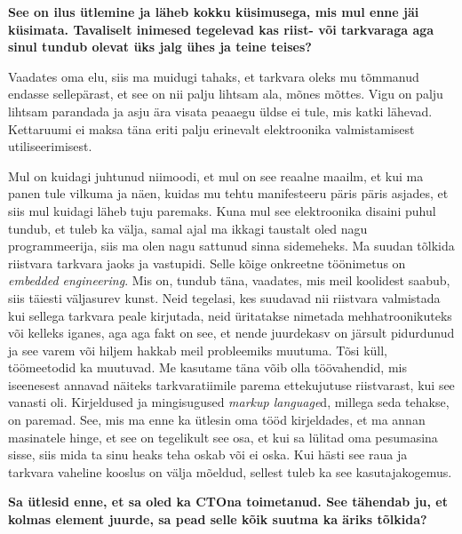 \textbf{See on ilus ütlemine ja läheb kokku küsimusega, mis mul enne jäi küsimata. Tavaliselt inimesed tegelevad kas riist- või tarkvaraga aga sinul tundub olevat üks jalg ühes ja teine teises?}

Vaadates oma elu, siis ma muidugi tahaks, et tarkvara oleks mu tõmmanud endasse sellepärast, et see on nii palju  lihtsam ala, mõnes mõttes. Vigu on palju lihtsam parandada ja asju ära visata peaaegu üldse ei tule, mis katki lähevad. Kettaruumi ei maksa täna eriti palju erinevalt elektroonika valmistamisest utiliseerimisest.

Mul on kuidagi juhtunud niimoodi, et mul on see reaalne maailm, et kui ma panen tule vilkuma ja näen, kuidas mu tehtu  manifesteeru päris päris asjades, et siis mul kuidagi läheb tuju paremaks. Kuna mul see elektroonika disaini puhul tundub, et tuleb ka välja, samal ajal ma ikkagi taustalt oled nagu programmeerija, siis ma olen nagu sattunud sinna sidemeheks. Ma suudan tõlkida riistvara tarkvara jaoks ja vastupidi. Selle kõige onkreetne töönimetus on \emph{embedded engineering}. Mis on, tundub täna, vaadates, mis meil koolidest saabub, siis täiesti väljasurev kunst. Neid tegelasi, kes suudavad nii riistvara valmistada kui sellega tarkvara peale kirjutada,  neid üritatakse nimetada mehhatroonikuteks või kelleks iganes, aga aga fakt on see, et nende juurdekasv on järsult pidurdunud ja see varem või hiljem hakkab meil probleemiks muutuma. Tõsi küll, töömeetodid ka muutuvad. Me kasutame täna võib olla töövahendid, mis iseenesest annavad näiteks tarkvaratiimile parema ettekujutuse riistvarast, kui see vanasti oli. Kirjeldused ja mingisugused \emph{markup language}d, millega  seda tehakse, on paremad. See, mis ma enne ka ütlesin oma tööd kirjeldades, et ma annan masinatele hinge, et see on tegelikult see osa, et kui sa lülitad oma pesumasina sisse, siis mida ta sinu heaks teha oskab või ei oska. Kui hästi see  raua ja tarkvara vaheline kooslus on välja mõeldud, sellest tuleb ka see kasutajakogemus. 

\textbf{Sa ütlesid enne, et sa oled ka CTOna toimetanud. See tähendab ju, et kolmas element juurde, sa pead selle kõik suutma ka äriks tõlkida?}

